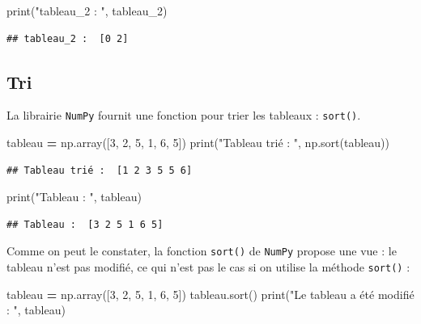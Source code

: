 \documentclass[12pt,]{book}
\newenvironment{Shaded}{\begin{snugshade}}{\end{snugshade}}
\newcommand{\DecValTok}[1]{\textcolor[rgb]{0.00,0.00,0.81}{#1}}
\newcommand{\StringTok}[1]{\textcolor[rgb]{0.31,0.60,0.02}{#1}}
\newcommand{\OperatorTok}[1]{\textcolor[rgb]{0.81,0.36,0.00}{\textbf{#1}}}
\newcommand{\BuiltInTok}[1]{#1}
\newcommand{\NormalTok}[1]{#1}
\numberwithin{equation}{section}
\numberwithin{countremarque}{section}
\begin{document}
\begin{Shaded}
\begin{Highlighting}[]
\BuiltInTok{print}\NormalTok{(}\StringTok{"tableau_2 : "}\NormalTok{, tableau_2)}
\end{Highlighting}
\end{Shaded}

\begin{lstlisting}
## tableau_2 :  [0 2]
\end{lstlisting}

\subsection{Tri}\label{tri-1}

La librairie \texttt{NumPy} fournit une fonction pour trier les tableaux
: \texttt{sort()}.

\begin{Shaded}
\begin{Highlighting}[]
\NormalTok{tableau }\OperatorTok{=}\NormalTok{ np.array([}\DecValTok{3}\NormalTok{, }\DecValTok{2}\NormalTok{, }\DecValTok{5}\NormalTok{, }\DecValTok{1}\NormalTok{, }\DecValTok{6}\NormalTok{, }\DecValTok{5}\NormalTok{])}
\BuiltInTok{print}\NormalTok{(}\StringTok{"Tableau trié : "}\NormalTok{, np.sort(tableau))}
\end{Highlighting}
\end{Shaded}

\begin{lstlisting}
## Tableau trié :  [1 2 3 5 5 6]
\end{lstlisting}

\begin{Shaded}
\begin{Highlighting}[]
\BuiltInTok{print}\NormalTok{(}\StringTok{"Tableau : "}\NormalTok{, tableau)}
\end{Highlighting}
\end{Shaded}

\begin{lstlisting}
## Tableau :  [3 2 5 1 6 5]
\end{lstlisting}

Comme on peut le constater, la fonction \texttt{sort()} de
\texttt{NumPy} propose une vue : le tableau n'est pas modifié, ce qui
n'est pas le cas si on utilise la méthode \texttt{sort()} :

\begin{Shaded}
\begin{Highlighting}[]
\NormalTok{tableau }\OperatorTok{=}\NormalTok{ np.array([}\DecValTok{3}\NormalTok{, }\DecValTok{2}\NormalTok{, }\DecValTok{5}\NormalTok{, }\DecValTok{1}\NormalTok{, }\DecValTok{6}\NormalTok{, }\DecValTok{5}\NormalTok{])}
\NormalTok{tableau.sort()}
\BuiltInTok{print}\NormalTok{(}\StringTok{"Le tableau a été modifié : "}\NormalTok{, tableau)}
\end{Highlighting}
\end{Shaded}
\end{document}
